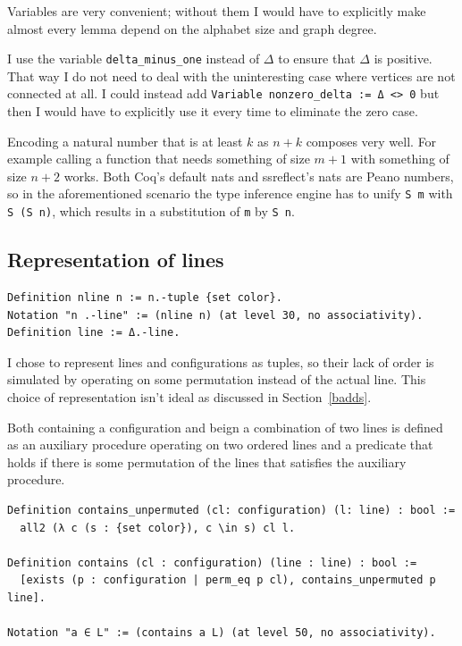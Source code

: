 \documentclass[english, 12pt, a4paper, sci, a-1b, online]{aaltothesis}
\newcommand\icoq[1]{\texttt{#1}}
\begin{document}
Variables are very convenient; without them I would have to explicitly make almost every lemma depend on the alphabet size and graph degree.

I use the variable \icoq{delta_minus_one} instead of $\Delta$ to ensure that $\Delta$ is positive. That way I do not need to deal with the uninteresting case where vertices are not connected at all. I could instead add \icoq{Variable nonzero_delta := Δ <> 0} but then I would have to explicitly use it every time to eliminate the zero case.

Encoding a natural number that is at least $k$ as $n + k$ composes very well. For example calling a function that needs something of size $m + 1$ with something of size $n + 2$ works. Both Coq's default nats and ssreflect's nats are Peano numbers, so in the aforementioned scenario the type inference engine has to unify \icoq{S m} with \icoq{S (S n)}, which results in a substitution of \icoq{m} by \icoq{S n}.

\subsection{Representation of lines}

\begin{verbatim}
Definition nline n := n.-tuple {set color}.
Notation "n .-line" := (nline n) (at level 30, no associativity).
Definition line := Δ.-line.
\end{verbatim}

I chose to represent lines and configurations as tuples, so their lack of order is simulated by operating on some permutation instead of the actual line. This choice of representation isn't ideal as discussed in Section~\ref{badds}.

Both containing a configuration and beign a combination of two lines is defined as an auxiliary procedure operating on two ordered lines and a predicate that holds if there is some permutation of the lines that satisfies the auxiliary procedure.

\begin{verbatim}
Definition contains_unpermuted (cl: configuration) (l: line) : bool :=
  all2 (λ c (s : {set color}), c \in s) cl l.

Definition contains (cl : configuration) (line : line) : bool :=
  [exists (p : configuration | perm_eq p cl), contains_unpermuted p line].

Notation "a ∈ L" := (contains a L) (at level 50, no associativity).
\end{verbatim}
\end{document}

